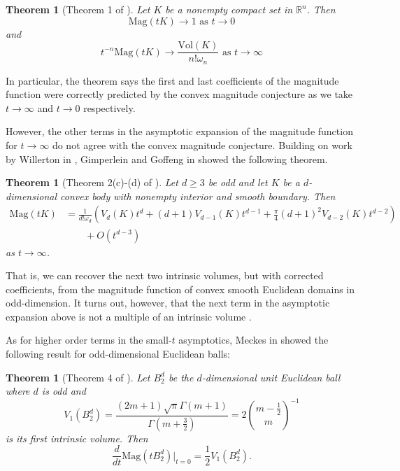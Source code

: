 \documentclass[11pt]{article}
\theoremstyle{mythm}
\newtheorem{theo}[defn]{Theorem}
\begin{document}
\begin{theo}[Theorem 1 of \cite{barcelo_magnitudes_2016}]\label{theo:bcasym}
Let $K$ be a nonempty compact set in $\mathbb{R}^n$. Then
\begin{equation*}
\text{Mag}(tK) \to 1 \text{ as $t \to 0$}
\end{equation*}
and
\begin{equation*}
t^{-n}\text{Mag}(tK) \to \frac{\text{Vol}(K)}{n!\omega_n} \text{ as $t\to\infty$}
\end{equation*}
\end{theo}

In particular, the theorem says the first and last coefficients of the magnitude function were correctly predicted by the convex magnitude conjecture as we take $t \to\infty$ and $t\to0$ respectively.

However, the other terms in the asymptotic expansion of the magnitude function for $t\to\infty$ do not agree with the convex magnitude conjecture. Building on work by Willerton in \cite{willerton_magnitude_2017}, Gimperlein and Goffeng in \cite{gimperlein_magnitude_2017} showed the following theorem.

\begin{theo}[Theorem 2(c)-(d) of \cite{gimperlein_magnitude_2017}]\label{theo:largeasym}
Let $d\geq3$ be odd and let $K$ be a $d$-dimensional convex body with nonempty interior and smooth boundary. Then
\begin{align*}
\text{Mag}(tK) &= \frac{1}{d!\omega_d}\left(V_d(K)t^d+(d+1)V_{d-1}(K)t^{d-1}+\frac{\pi}{4}(d+1)^2V_{d-2}(K)t^{d-2}\right) \\
&\qquad+ O(t^{d-3})
\end{align*}
as $t\to\infty$.
\end{theo}

That is, we can recover the next two intrinsic volumes, but with corrected coefficients, from the magnitude function of convex smooth Euclidean domains in odd-dimension. It turns out, however, that the next term in the asymptotic expansion above is not a multiple of an intrinsic volume \cite{meckes_magnitude_2019}.

As for higher order terms in the small-$t$ asymptotics, Meckes in \cite{meckes_magnitude_2019} showed the following result for odd-dimensional Euclidean balls:

\begin{theo}[Theorem 4 of \cite{meckes_magnitude_2019}]\label{theo:firstorder}
Let $B_2^d$ be the $d$-dimensional unit Euclidean ball where $d$ is odd and
\begin{equation*}
V_1\left(B_2^d\right) = \frac{(2m+1)\sqrt{\pi}\Gamma(m+1)}{\Gamma\left(m+\frac{3}{2}\right)} = 2\binom{m-\frac{1}{2}}{m}^{-1}
\end{equation*}
is its first intrinsic volume. Then
\begin{equation*}
\frac{d}{dt}\text{Mag}(tB_2^d)\big\vert_{t=0} = \frac{1}{2}V_1(B_2^d).
\end{equation*}
\end{theo}
\end{document}
